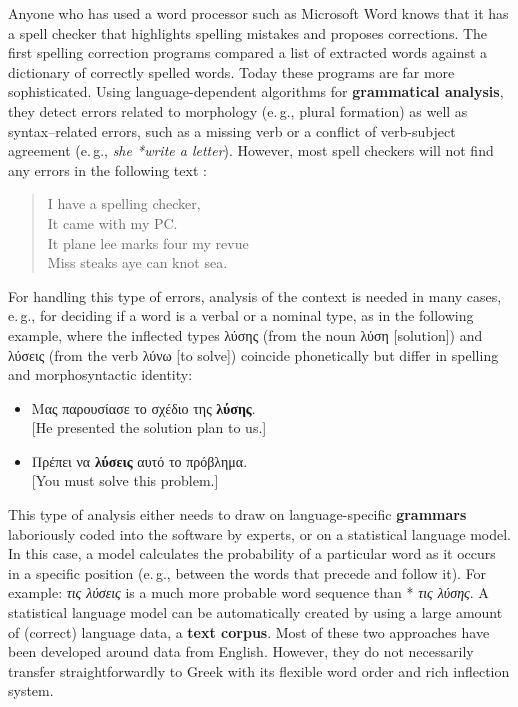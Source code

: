 \begin{multicols}{2}
Anyone who has used a word processor such as Microsoft Word knows that it has a spell checker that highlights spelling mistakes and proposes corrections. The first spelling correction programs compared a list of extracted words against a dictionary of correctly spelled words. Today these programs are far more sophisticated. Using language-dependent algorithms for \textbf{grammatical analysis}, they detect errors related to morphology (e.\,g., plural formation) as well as syntax–related errors, such as a missing verb or a conflict of verb-subject agreement (e.\,g., \textit{she *write a letter}). However, most spell checkers will not find any errors in the following text \cite{zar1}:

\begin{quote}
  I have a spelling checker,\\
  It came with my PC.\\
  It plane lee marks four my revue\\
  Miss steaks aye can knot sea.
\end{quote}

For handling this type of errors, analysis of the context is needed in many cases, e.\,g., for deciding if a word is a verbal or a nominal type, as in the following example, where the inflected types λύσης (from the noun λύση [solution]) and λύσεις (from the verb λύνω [to solve]) coincide phonetically but differ in spelling and morphosyntactic identity:

\begin{itemize}
\item Μας παρουσίασε το σχέδιο της \textbf{λύσης}.\\
{[}He presented the solution plan to us.{]} 
\item Πρέπει να \textbf{λύσεις } αυτό το πρόβλημα.\\
{[}You must solve this problem.{]}
\end{itemize}

This type of analysis either needs to draw on language-specific \textbf{grammars} laboriously coded into the software by experts, or on a statistical language model. In this case, a model calculates the probability of a particular word as it occurs in a specific position (e.\,g., between the words that precede and follow it). For example: \textit{τις λύσεις} is a much more probable word sequence than * \textit{τις λύσης}. A statistical language model can be automatically created by using a large amount of (correct) language data, a \textbf{text corpus}. Most of these two approaches have been developed around data from English. However, they do not necessarily transfer straightforwardly to Greek with its flexible word order and rich inflection system.


\end{multicols}
